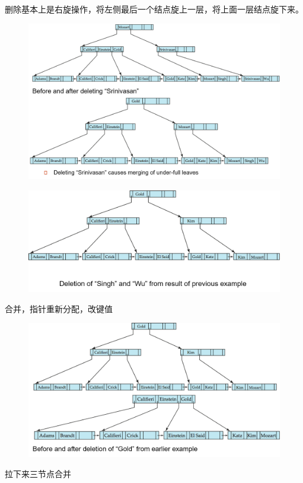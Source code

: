 删除基本上是右旋操作，将左侧最后一个结点旋上一层，将上面一层结点旋下来。
\begin{figure}[H]
\centering
\includegraphics[width=0.8\linewidth]{fig/bp-tree_deletion.png}
\end{figure}
\begin{figure}[H]
\centering
\includegraphics[width=0.8\linewidth]{fig/bp-tree_deletion2.png}
\end{figure}
合并，指针重新分配，改键值
\begin{figure}[H]
\centering
\includegraphics[width=0.8\linewidth]{fig/bp-tree_deletion3.png}
\end{figure}
拉下来三节点合并
